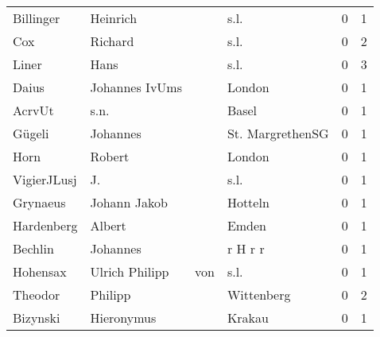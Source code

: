 \begin{tabular}{llllrr}
                Billinger &                           Heinrich &             &                                        s.l. &          0 &         1 \\
                      Cox &                            Richard &             &                                        s.l. &          0 &         2 \\
                    Liner &                               Hans &             &                                        s.l. &          0 &         3 \\
                    Daius &                     Johannes IvUms &             &                                      London &          0 &         1 \\
                   AcrvUt &                               s.n. &             &                                       Basel &          0 &         1 \\
                   Gügeli &                           Johannes &             &                            St. MargrethenSG &          0 &         1 \\
                     Horn &                             Robert &             &                                      London &          0 &         1 \\
              VigierJLusj &                                 J. &             &                                        s.l. &          0 &         1 \\
                 Grynaeus &                       Johann Jakob &             &                                     Hotteln &          0 &         1 \\
               Hardenberg &                             Albert &             &                                       Emden &          0 &         1 \\
                  Bechlin &                           Johannes &             &                                     r H r r &          0 &         1 \\
                 Hohensax &                     Ulrich Philipp &         von &                                        s.l. &          0 &         1 \\
                  Theodor &                            Philipp &             &                                  Wittenberg &          0 &         2 \\
                 Bizynski &                         Hieronymus &             &                                      Krakau &          0 &         1 \\

\end{tabular}
